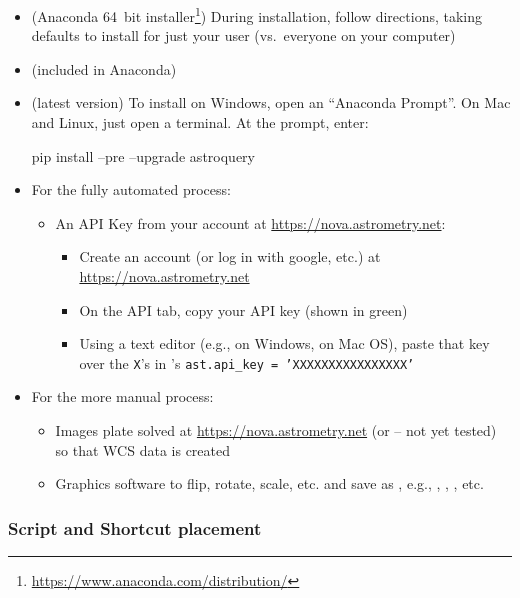 \begin{itemize}
\item {} (Anaconda 64~bit
  installer\footnote{\url{https://www.anaconda.com/distribution/}}) During
  installation, follow directions, taking defaults to install for
  just your user (vs.\ everyone on your computer)
\item {} (included in Anaconda)
\item {} (latest version) To install on Windows,
  open an ``Anaconda Prompt''. On Mac and Linux, just open a
  terminal. At the prompt, enter:
  \begin{commands}
    pip install --pre --upgrade astroquery
  \end{commands}
\item For the fully automated process:
  \begin{itemize}
  \item An API Key from your account at \url{https://nova.astrometry.net}:
    \begin{itemize}
    \item Create an account (or log in with google, etc.) at \url{https://nova.astrometry.net}
    \item On the API tab, copy your API key (shown in green)
    \item Using a text editor (e.g.,  on Windows,
       on Mac OS), paste that key over the \texttt{X}'s
      in 's
      \texttt{ast.api\_key = 'XXXXXXXXXXXXXXXX'}
    \end{itemize}
  \end{itemize}
\item For the more manual process: 
  \begin{itemize}
  \item Images plate solved at \url{https://nova.astrometry.net} (or  -- not yet tested) so that WCS data is created
  \item Graphics software to flip, rotate, scale, etc. and save as , e.g., , , , etc.
  \end{itemize}
\end{itemize}

\subsubsection{Script and Shortcut placement}

